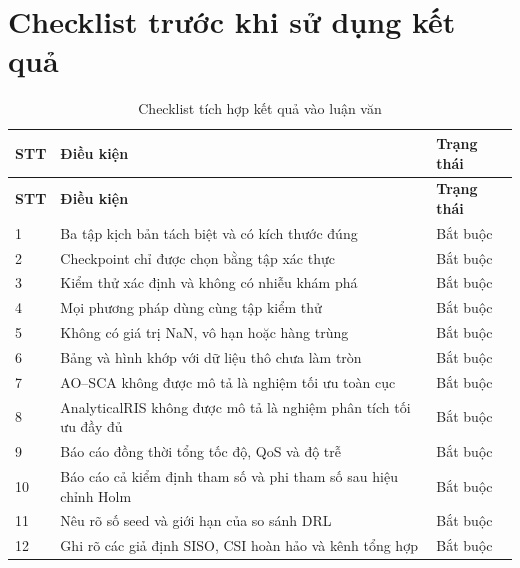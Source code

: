 \section{Checklist trước khi sử dụng kết quả}
\begin{longtable}{p{1.0cm}p{11.5cm}p{1.7cm}}
\caption{Checklist tích hợp kết quả vào luận văn}\label{tab:integration-checklist}\\
\toprule
\textbf{STT} & \textbf{Điều kiện} & \textbf{Trạng thái}\\
\midrule
\endfirsthead
\toprule
\textbf{STT} & \textbf{Điều kiện} & \textbf{Trạng thái}\\
\midrule
\endhead
1 & Ba tập kịch bản tách biệt và có kích thước đúng & Bắt buộc\\
2 & Checkpoint chỉ được chọn bằng tập xác thực & Bắt buộc\\
3 & Kiểm thử xác định và không có nhiễu khám phá & Bắt buộc\\
4 & Mọi phương pháp dùng cùng tập kiểm thử & Bắt buộc\\
5 & Không có giá trị NaN, vô hạn hoặc hàng trùng & Bắt buộc\\
6 & Bảng và hình khớp với dữ liệu thô chưa làm tròn & Bắt buộc\\
7 & AO--SCA không được mô tả là nghiệm tối ưu toàn cục & Bắt buộc\\
8 & AnalyticalRIS không được mô tả là nghiệm phân tích tối ưu đầy đủ & Bắt buộc\\
9 & Báo cáo đồng thời tổng tốc độ, QoS và độ trễ & Bắt buộc\\
10 & Báo cáo cả kiểm định tham số và phi tham số sau hiệu chỉnh Holm & Bắt buộc\\
11 & Nêu rõ số seed và giới hạn của so sánh DRL & Bắt buộc\\
12 & Ghi rõ các giả định SISO, CSI hoàn hảo và kênh tổng hợp & Bắt buộc\\
\bottomrule
\end{longtable}
